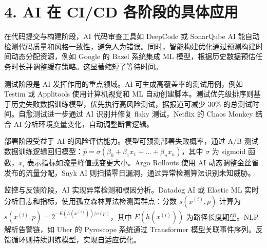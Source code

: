 \chapter{4. AI 在 CI/CD 各阶段的具体应用}
在代码提交与构建阶段，AI 代码审查工具如 DeepCode 或 SonarQube AI 能自动检测代码质量和风格一致性，避免人为错误。同时，智能构建优化通过预测构建时间动态分配资源，例如 Google 的 Bazel 系统集成 ML 模型，根据历史数据预估任务时长并调整缓存策略。这显著缩短了等待时间。\par
测试阶段是 AI 发挥作用的重点领域。AI 可生成高覆盖率的测试用例，例如 Testim 或 Applitools 使用计算机视觉和 ML 自动创建脚本。测试优先级排序则基于历史失败数据训练模型，优先执行高风险测试，据报道可减少 30\%{} 的总测试时间。自愈测试进一步通过 AI 识别并修复 flaky 测试，Netflix 的 Chaos Monkey 结合 AI 分析环境变量变化，自动调整断言逻辑。\par
部署阶段受益于 AI 的风险评估能力。模型可预测部署失败概率，通过 A/B 测试数据训练逻辑回归模型：$\hat{p} = \sigma(\beta_0 + \beta_1 x_1 + \dots + \beta_n x_n)$，其中 $\sigma$ 为 sigmoid 函数，$x_i$ 表示指标如流量峰值或变更大小。Argo Rollouts 使用 AI 动态调整金丝雀发布的流量分配，Snyk AI 则扫描零日漏洞，通过异常检测算法识别未知威胁。\par
监控与反馈阶段，AI 实现异常检测和根因分析。Datadog AI 或 Elastic ML 实时分析日志和指标，使用孤立森林算法检测离群点：分数 $s(x^{(i)}, p)$ 计算为 $s(x^{(i)}, p) = 2^{-E(h(x^{(i)}))/c(p)}$，其中 $E(h(x^{(i)}))$ 为路径长度期望。NLP 解析告警链，如 Uber 的 Pyroscope 系统通过 Transformer 模型关联事件序列。反馈循环则持续训练模型，实现自适应优化。\par
